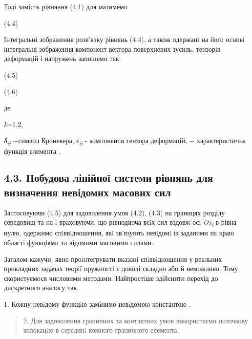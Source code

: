 Тоді замість рівняння (4.1) для матимемо

(4.4)

Інтегральні зображення розв'язку рівнянь (4.4), а також одержані на його
основі інтегральні зображення компонент вектора поверхневих зусиль,
тензорів деформацій і напружень запишемо так:

(4.5)

(4.6)

де

\emph{k}=1,2,

\emph{δ\textsubscript{ij}} −символ Кронекера, \emph{ε\textsubscript{ij}}
- компоненти тензора деформацій, − характе­ристична функція елемента .

\hypertarget{ux43fux43eux431ux443ux434ux43eux432ux430-ux43bux456ux43dux456ux439ux43dux43eux457-ux441ux438ux441ux442ux435ux43cux438-ux440ux456ux432ux43dux44fux43dux44c-ux434ux43bux44f-ux432ux438ux437ux43dux430ux447ux435ux43dux43dux44f-ux43dux435ux432ux456ux434ux43eux43cux438ux445-ux43cux430ux441ux43eux432ux438ux445-ux441ux438ux43b}{%
\subsection{4.3. Побудова лінійної системи рівнянь для визначення
невідомих масових
сил}\label{ux43fux43eux431ux443ux434ux43eux432ux430-ux43bux456ux43dux456ux439ux43dux43eux457-ux441ux438ux441ux442ux435ux43cux438-ux440ux456ux432ux43dux44fux43dux44c-ux434ux43bux44f-ux432ux438ux437ux43dux430ux447ux435ux43dux43dux44f-ux43dux435ux432ux456ux434ux43eux43cux438ux445-ux43cux430ux441ux43eux432ux438ux445-ux441ux438ux43b}}

Застосовуючи (4.5) для задоволення умов (4.2), (4.3) на границях розділу
середовищ та на i враховуючи, що рівнодіюча всiх сил вздовж осі
\emph{Ox\textsubscript{i}} в рівна нулю, одержи­мо спiввiдношення, якi
зв'язують невiдомi із заданими на краю області функціями та відомими
масовими силами.

Загалом кажучи, явно проiнте­гру­ва­ти вказані спiввiд­ношення у
реальних прикладних задачах теорії пружності є доволі складно або й
неможливо. Тому скористуємося числовими методами. Найпростiше здiйснити
перехід до дискретного аналогу так.

1. Кожну невiдому функцiю замiнимо невiдомою константою .

\begin{quote}
2. Для задоволення граничних та контактних умов використаємо поточкову
колокацiю в серединi кожного граничного елемента.
\end{quote}

